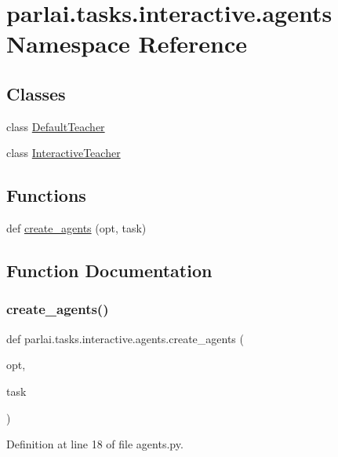 \hypertarget{namespaceparlai_1_1tasks_1_1interactive_1_1agents}{}\section{parlai.\+tasks.\+interactive.\+agents Namespace Reference}
\label{namespaceparlai_1_1tasks_1_1interactive_1_1agents}
\subsection*{Classes}
\begin{DoxyCompactItemize}
\item 
class \hyperlink{classparlai_1_1tasks_1_1interactive_1_1agents_1_1DefaultTeacher}{Default\+Teacher}
\item 
class \hyperlink{classparlai_1_1tasks_1_1interactive_1_1agents_1_1InteractiveTeacher}{Interactive\+Teacher}
\end{DoxyCompactItemize}
\subsection*{Functions}
\begin{DoxyCompactItemize}
\item 
def \hyperlink{namespaceparlai_1_1tasks_1_1interactive_1_1agents_af1eee4433fa720c868ac8cea506bfc89}{create\+\_\+agents} (opt, task)
\end{DoxyCompactItemize}


\subsection{Function Documentation}
\mbox{\label{namespaceparlai_1_1tasks_1_1interactive_1_1agents_af1eee4433fa720c868ac8cea506bfc89}} 
\subsubsection{\texorpdfstring{create\+\_\+agents()}{create\_agents()}}
{\footnotesize\ttfamily def parlai.\+tasks.\+interactive.\+agents.\+create\+\_\+agents (\begin{DoxyParamCaption}\item[{}]{opt,  }\item[{}]{task }\end{DoxyParamCaption})}



Definition at line 18 of file agents.\+py.

